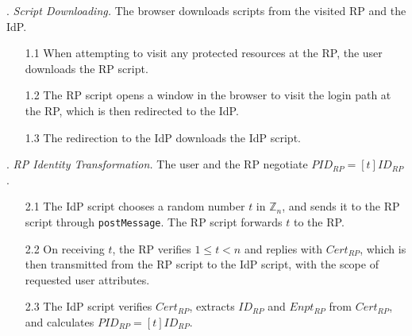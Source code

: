 \vspace{0.5mm}
. {\em Script Downloading.}
The browser downloads scripts from the visited RP and the IdP.
\vspace{-\topsep}
\begin{itemize}
\setlength{\topsep}{0pt}
\setlength{\partopsep}{0pt}
\setlength{\itemsep}{0pt}
\setlength{\parsep}{0pt}
\setlength{\parskip}{0pt}
\item[1.1]
When attempting to visit any protected resources at the RP,
    the user downloads the RP script.
\item[1.2]
The RP script opens a window in the browser to visit the login path at the RP, which is then redirected to the IdP.
\item[1.3]
The redirection to the IdP downloads the IdP script.
\end{itemize}



. {\em RP Identity Transformation.}
The user and the RP negotiate $PID_{RP} = [t]{ID_{RP}}$.
\vspace{-\topsep}
\begin{itemize}
\setlength{\topsep}{0pt}
\setlength{\partopsep}{0pt}
\setlength{\itemsep}{0pt}
\setlength{\parsep}{0pt}
\setlength{\parskip}{0pt}
\item[2.1] The IdP script chooses a random number $t$ in $\mathbb{Z}_n$,
 and sends it to the RP script through \verb+postMessage+.
The RP script forwards $t$ to the RP.
\item[2.2] On receiving $t$,
the RP verifies $1 \leq t < n$ and %
 replies with $Cert_{RP}$, which is then transmitted from the RP script to the IdP script,
    with the scope of requested user attributes.  %
\item[2.3] The IdP script verifies $Cert_{RP}$, extracts $ID_{RP}$ and $Enpt_{RP}$ from $Cert_{RP}$, and calculates $PID_{RP}=[t]{ID_{RP}}$.

\end{itemize}


